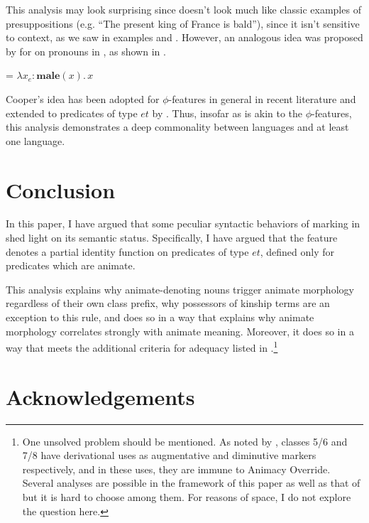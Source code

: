 \documentclass[output=paper,newtxmath,modfonts,nonflat,hidelinks]{langsci/langscibook}
\begin{document}
This analysis may look surprising since  doesn't look much like classic examples of presuppositions (e.g. ``The present king of France is bald''), since it isn't sensitive to context, as we saw in examples  and . However, an analogous idea was proposed by \citet{cooper83} for  on pronouns in , as shown in .

\ea\label{ex:pesetsky:cooper}  = $\lambda x_e : \textbf{male}(x). \, x$ \z

Cooper's idea has been adopted for $\phi$-features in general in recent literature \citep{hnk91, sauerland08, heim08} and extended to predicates of type $et$ by \citet{merchant14}. Thus, insofar as  is akin to the $\phi$-features, this analysis demonstrates a deep commonality between  languages and at least one  language.

 \section{Conclusion} \label{sec:pesetsky:concludesection}

In this paper, I have argued that some peculiar syntactic behaviors of  marking in  shed light on its semantic status.  Specifically, I have argued that the  feature denotes a partial identity function on predicates of type $et$, defined only for predicates which are animate. 

This analysis explains why animate-denoting nouns trigger animate morphology regardless of their own class prefix, why possessors of kinship terms are an exception to this rule, and does so in a way that explains why animate morphology correlates strongly with animate meaning. Moreover, it does so in a way that meets the additional criteria for adequacy listed in .\footnote{One unsolved problem should be mentioned.  As noted by \citet{carstens91}, classes 5/6 and 7/8 have derivational uses as augmentative and diminutive markers respectively, and in these uses, they are immune to Animacy Override.  Several analyses are possible in the framework of this paper as well as that of \citet{carstens91} but it is hard to choose among them.  For reasons of space, I do not explore the question here.}

 
 
 \section*{Acknowledgements} \label{sec:pesetsky:acknowledgements}
\end{document}
